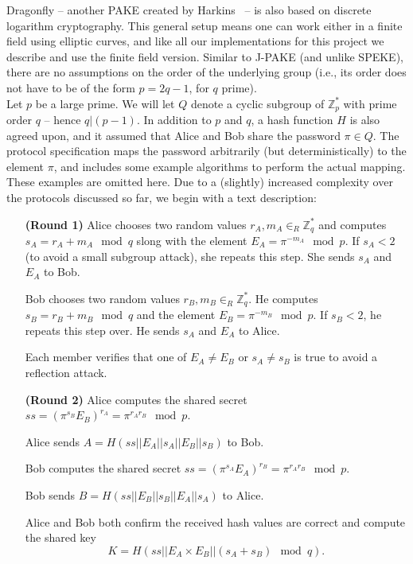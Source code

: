 
Dragonfly -- another PAKE created by Harkins~\cite{Ha15} -- is also based on discrete logarithm cryptography.  This general setup means one can work  either in a finite field using elliptic curves, and like all our implementations for this project we describe and use the finite field version. 
Similar to J-PAKE (and unlike SPEKE), there are no assumptions on the order of the underlying group (i.e., its order does not have to be of the
form $p = 2q-1$, for $q$ prime).
\\

Let $p$ be a large prime. We will let $Q$ denote a cyclic subgroup of $\mathbb{Z}_p^*$ with prime order $q$ -- hence $q | (p-1)$. In addition to $p$ and $q$, a hash function $H$ is also agreed upon, and it assumed that Alice and Bob share the password $\pi \in Q$. The protocol specification maps the password
arbitrarily (but deterministically) to the element $\pi$, and includes some example algorithms to perform the actual mapping. These examples are omitted here. Due to a (slightly) increased complexity over the protocols discussed so far, we begin with a text description:

\begin{itemize}
    \item[\textbf{(Round 1)}] Alice chooses two random values $r_A, m_A \in_R \mathbb{Z}_q^*$ and computes $s_A = r_A + m_A \mod q$ slong with the element
        $E_A = \pi^{-m_A} \mod p$. If $s_A < 2$ (to avoid a small subgroup attack), she repeats this step. She sends $s_A$ and $E_A$ to Bob.
        \label{enum:dragonfly2}
        \item[]
    \item[] Bob chooses two random values $r_B, m_B \in_R \mathbb{Z}_q^*$. He computes $s_B = r_B + m_B \mod q$ and the element
        $E_B = \pi^{-m_B} \mod p$. If $s_B < 2$, he repeats this step over. He sends $s_A$ and $E_A$ to Alice.
        \label{enum:dragonfly3}
    \item[]
    \item[] Each member verifies that one of $E_A \neq E_B$ or $s_A \neq s_B$ is true to avoid a reflection attack. 
    \item[]
    \item[\textbf{(Round 2)}] Alice computes the shared secret $ss = (\pi^{s_B} E_B)^{r_A} = \pi^{r_A r_B} \mod p$. 
    \item[] Alice sends $A = H(ss || E_A || s_A || E_B || s_B)$ to Bob.
    \item[]
    \item[] Bob computes the shared secret $ss = (\pi^{s_A} E_A)^{r_B} = \pi^{r_A r_B} \mod p$. 
    \item[] Bob sends $B = H(ss || E_B || s_B || E_A || s_A)$ to Alice.
    \item[]
    \item[] Alice and Bob both confirm the received hash values are correct and compute the shared key 
    \[ K = H(ss || E_A \times E_B || (s_A + s_B) \mod q).\]
\end{itemize}

